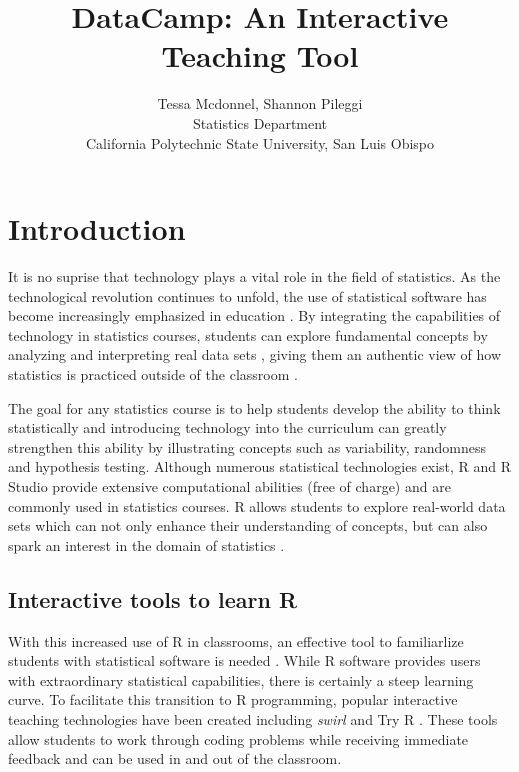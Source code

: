 \documentclass[12pt]{article}\usepackage[]{graphicx}\usepackage[]{color}
\title{DataCamp: An Interactive Teaching Tool}
\author{Tessa Mcdonnel, Shannon Pileggi \\Statistics Department \\ California Polytechnic State University, San Luis Obispo}
\begin{document}
\maketitle

\section{Introduction}

\doublespacing

It is no suprise that technology plays a vital role in the field of statistics. As the technological revolution continues to
unfold, the use of statistical software has become increasingly emphasized in education \citep{AmericanStatisticalAssociation2016}. By integrating the
capabilities of technology in statistics courses, students can explore fundamental concepts by analyzing and
interpreting real data sets \citep{Chance2007, Hardin2015, Horton2014}, giving them an authentic view of how statistics is practiced outside of the
classroom \citep{Wang2017}.

The goal for any statistics course is to help students develop the ability to think statistically
\citep{AmericanStatisticalAssociation2016} and introducing technology into the curriculum can greatly strengthen this ability by illustrating concepts such as
variability, randomness and hypothesis testing. Although numerous statistical technologies exist, R and R Studio
provide extensive computational abilities (free of charge) and are commonly used in statistics courses. R
allows students to explore real-world data sets which can not only enhance their understanding of concepts, but can also spark
an interest in the domain of statistics \citep{Wang2017}.


\subsection{Interactive tools to learn R}
With this increased use of R in classrooms, an effective tool to familiarlize students with statistical software is needed
\citep{Baumer2014}. While R software provides users with extraordinary statistical capabilities, there is certainly a steep learning curve. To facilitate
this transition to R programming, popular interactive teaching technologies have been created including \textit{swirl} \citep{Kross} and Try R \citep{TryR}. 
These tools allow students to work through coding problems while receiving immediate feedback and can be used in and out of the classroom. 
\end{document}
